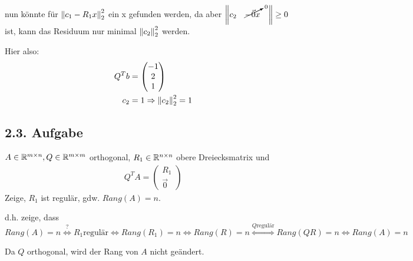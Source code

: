 nun könnte für $\left\lVert c_1 -R_1x\right\rVert_2^2$ ein x gefunden werden, da aber $\left\lVert c_2 \quad\cancelto{0}{-\vec{0}x}\quad\right\rVert \geq 0$ ist, kann das Residuum nur minimal $\left\lVert c_2\right\rVert_2^2$ werden.

Hier also:
\begin{equation}\begin{split}
	Q^Tb &= \begin{pmatrix}
		-1\\2\\1
	\end{pmatrix}\\
	c_2 &= 1 \Rightarrow
	\left\lVert c_2\right\rVert_2^2 = 1
\end{split}\end{equation}



\subsection*{2.3. Aufgabe}
$A\in {\mathbb R}^{m\times n}, Q \in {\mathbb R}^{m\times m}$ orthogonal, $R_1\in {\mathbb R}^{n\times n}$ obere Dreiecksmatrix und
\begin{equation}\begin{split}
	Q^TA = \begin{pmatrix}
		R_1\\\vec{0}
	\end{pmatrix}
\end{split}\end{equation}
Zeige, $R_1$ ist regulär, gdw. $Rang(A) = n$.




d.h. zeige, dass $Rang(A) = n \stackrel{?}{\Leftrightarrow} R_1 \text{regulär} \Leftrightarrow Rang(R_1) = n \Leftrightarrow Rang(R) = n
\stackrel{Q \text{regulär}}{\Leftrightarrow} Rang(QR) = n 
\Leftrightarrow Rang(A) = n$

Da $Q$ orthogonal, wird der Rang von $A$ nicht geändert.
















